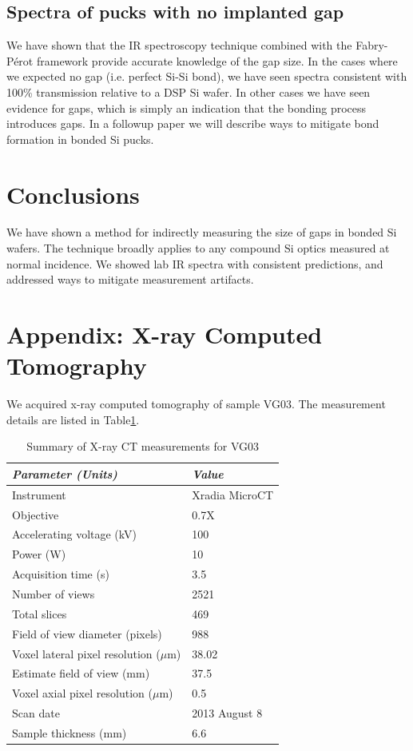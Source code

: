 \documentclass[osajnl,preprint,showpacs,superscriptaddress,12pt]{revtex4-1} %
\begin{document}
\subsection{Spectra of pucks with no implanted gap}
We have shown that the IR spectroscopy technique combined with the Fabry-P\'{e}rot framework provide accurate knowledge of the gap size.  In the cases where we expected no gap (i.e. perfect Si-Si bond), we have seen spectra consistent with 100\% transmission relative to a DSP Si wafer.  In other cases we have seen evidence for gaps, which is simply an indication that the bonding process introduces gaps.  In a followup paper we will describe ways to mitigate bond formation in bonded Si pucks.

\section{Conclusions}
We have shown a method for indirectly measuring the size of gaps in bonded Si wafers.  The technique broadly applies to any compound Si optics measured at normal incidence.  We showed lab IR spectra with consistent predictions, and addressed ways to mitigate measurement artifacts. 

\appendix

\section{Appendix: X-ray Computed Tomography}
We acquired x-ray computed tomography of sample VG03.  The measurement details are listed in Table\ref{tab:tablenum4}.

\begin{table}[h!]
\caption{Summary of X-ray CT measurements for VG03 \label{tab:tablenum4}}
\begin{center}
    \begin{tabular}{ll}
    \hline
    \emph{Parameter (Units)} & \emph{Value} \\ 
    \hline
    Instrument& Xradia MicroCT \\
     Objective & 0.7X \\
    Accelerating voltage (kV) & 100 \\
        Power (W) & 10 \\
        Acquisition time (s) & 3.5 \\
        Number of views & 2521 \\
        Total slices & 469 \\
        Field of view diameter (pixels) & 988 \\
        Voxel lateral pixel resolution ($\mu$m) & 38.02 \\
        Estimate field of view (mm) & 37.5 \\
        Voxel axial pixel resolution ($\mu$m) & 0.5 \\
        Scan date & 2013 August 8 \\
        Sample thickness (mm) & 6.6 \\
    \hline
     \end{tabular}
\end{center}
\end{table}
\end{document}
